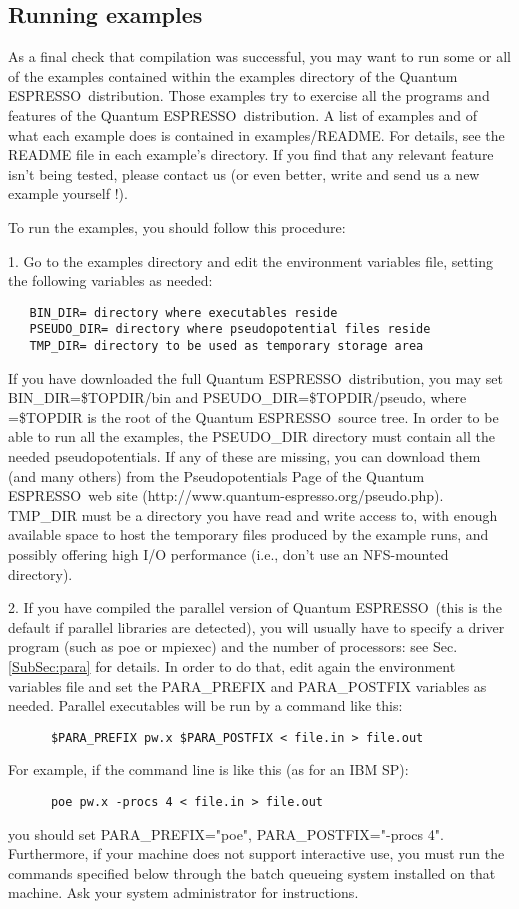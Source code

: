 \documentclass[12pt,a4paper]{article}
\def\qe{{\sc Quantum ESPRESSO}}
\begin{document}
\subsection{Running examples}

As a final check that compilation was successful, you may want to run some or
all of the examples contained within the examples directory of the 
\qe\ distribution. Those examples try to exercise all the programs
and features of the \qe\ distribution. A list of examples and
of what each example does is contained in examples/README. For details,
see the README file in each example's directory. If you find that any relevant
feature isn't being tested, please contact us (or even better, write and send
us a new example yourself !).
     
To run the examples, you should follow this procedure:

    
1. Go to the examples directory and edit the environment variables
   file, setting the following variables as needed: 
\begin{verbatim}
   BIN_DIR= directory where executables reside
   PSEUDO_DIR= directory where pseudopotential files reside
   TMP_DIR= directory to be used as temporary storage area
\end{verbatim}
If you have downloaded the full \qe\ distribution, you may set 
BIN\_DIR=\$TOPDIR/bin and PSEUDO\_DIR=\$TOPDIR/pseudo, where =\$TOPDIR
is the root of the \qe\ source tree. In order to be able
to run all the examples, the PSEUDO\_DIR directory must contain all the
needed pseudopotentials. 
If any of these are missing, you can download them (and many others)
from the Pseudopotentials Page of the \qe\ web site
(http://www.quantum-espresso.org/pseudo.php). TMP\_DIR must be a
directory you 
have read and write access to, with enough available space to host the
temporary files produced by the example runs, and possibly offering
high I/O performance (i.e., don't use an NFS-mounted directory). 

2. If you have compiled the parallel version of \qe\ (this
is the default if parallel libraries are detected), you will usually
have to specify a driver program (such as poe or mpiexec) and the
number of processors: see Sec.\ref{SubSec:para} for
details. In order to do that, edit again the environment variables file
and set the PARA\_PREFIX and PARA\_POSTFIX variables as needed. Parallel
executables will be run by a command like this: 
\begin{verbatim}
      $PARA_PREFIX pw.x $PARA_POSTFIX < file.in > file.out
\end{verbatim}
For example, if the command line is like this (as for an IBM SP):
\begin{verbatim}
      poe pw.x -procs 4 < file.in > file.out
\end{verbatim}
you should set PARA\_PREFIX="poe", PARA\_POSTFIX="-procs
4". Furthermore, if your machine does not support interactive use, you
must run the commands specified below through the batch queueing
system installed on that machine. Ask your system administrator for
instructions. 
\end{document}
